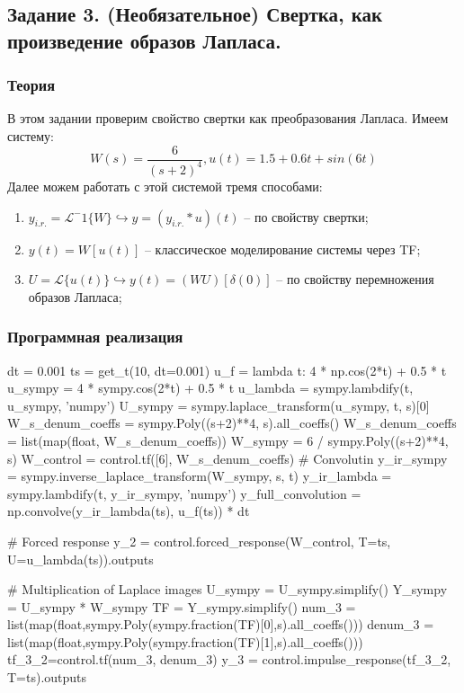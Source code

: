 \documentclass[16pt]{article}
\begin{document}
\pagebreak
\subsection{Задание 3. (Необязательное) Свертка, как произведение образов Лапласа.}
\subsubsection{Теория}
В этом задании проверим свойство свертки как преобразования Лапласа. Имеем систему:
\[
    W(s) = \frac{6}{(s+2)^4}, u(t) = 1.5 + 0.6t + sin(6t)
\]
Далее можем работать с этой системой тремя способами:
\begin{enumerate}
\item \(y_{i.r.} = \mathscr{L}^-1\{W\} \hookrightarrow y = (y_{i.r.} * u)(t)\) -- по свойству свертки;
\item \(y(t) = W[u(t)]\) -- классическое моделирование системы через TF;
\item \(U = \mathscr{L}\{u(t)\} \hookrightarrow y(t) = (WU)[\delta(0)]\) -- по свойству перемножения образов Лапласа;
\end{enumerate}


\subsubsection{Программная реализация}
\begin{python}
dt = 0.001
ts = get_t(10, dt=0.001)
u_f = lambda t: 4 * np.cos(2*t) +  0.5 * t
u_sympy = 4 * sympy.cos(2*t) + 0.5 * t
u_lambda = sympy.lambdify(t, u_sympy, 'numpy')
U_sympy = sympy.laplace_transform(u_sympy, t, s)[0]
W_s_denum_coeffs = sympy.Poly((s+2)**4, s).all_coeffs()
W_s_denum_coeffs = list(map(float, W_s_denum_coeffs))
W_sympy = 6 / sympy.Poly((s+2)**4, s)
W_control = control.tf([6], W_s_denum_coeffs)
#  Convolutin
y_ir_sympy = sympy.inverse_laplace_transform(W_sympy, s, t)
y_ir_lambda = sympy.lambdify(t, y_ir_sympy, 'numpy')
y_full_convolution = np.convolve(y_ir_lambda(ts), u_f(ts)) * dt

#  Forced response
y_2 = control.forced_response(W_control, T=ts, U=u_lambda(ts)).outputs

#  Multiplication of Laplace images
U_sympy = U_sympy.simplify()
Y_sympy = U_sympy * W_sympy 
TF = Y_sympy.simplify()
num_3 = list(map(float,sympy.Poly(sympy.fraction(TF)[0],s).all_coeffs()))
denum_3 = list(map(float,sympy.Poly(sympy.fraction(TF)[1],s).all_coeffs()))
tf_3_2=control.tf(num_3, denum_3)
y_3 = control.impulse_response(tf_3_2, T=ts).outputs
\end{python}
\end{document}
